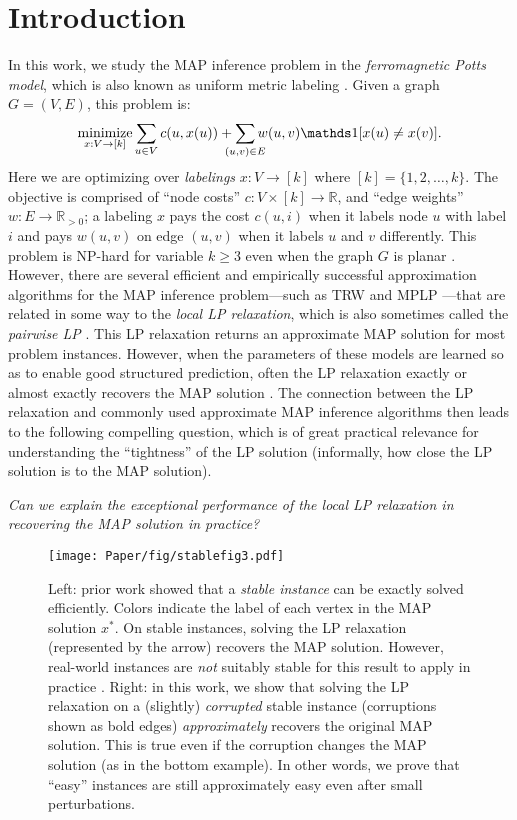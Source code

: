 \section{Introduction}
In this work, we study the MAP inference problem in the \emph{ferromagnetic Potts model}, which is also known as uniform metric labeling \citep{KleinbergTardos02}. Given a graph $G=(V,E)$, this problem is:
\begin{align*}
  \minimize_{x: V\to [k]}\sum_{u\in V}c(u, x(u)) + \smashoperator{\sum_{(u,v) \in E}}w(u,v)\indicator[x(u) \ne x(v)].
\end{align*}
Here we are optimizing over \emph{labelings} $x: V\to [k]$ where $ [k] = \{1,2,\dots,k\}$. 
The objective is comprised of ``node costs'' $c: V\times [k] \to \mathbb{R}$, and ``edge weights'' $w: E \to \mathbb{R}_{> 0}$; a labeling $x$ pays the cost $c(u,i)$ when it labels node $u$ with label $i$ and pays $w(u,v)$ on edge $(u,v)$ when it labels $u$ and $v$ differently.
This problem is NP-hard for variable $k \ge 3$ \citep{KleinbergTardos02} even when the graph $G$ is planar \citep{dahlhaus1992complexity}.
However, there are several efficient and empirically successful approximation algorithms for the MAP inference problem---such as TRW \citep{wainwright2005map} and MPLP \citep{globerson2008fixing}---that are related in some way to the \emph{local LP relaxation}, which is also sometimes called the {\em pairwise LP} \cite{wainwright2008graphical, chekuri2001approximation}.  
This LP relaxation returns an approximate MAP solution for most problem instances. However, when the parameters of these models are learned so as to enable good structured prediction, often the LP relaxation exactly or almost exactly recovers the MAP solution  \citep{meshi2019train}.
The connection between the LP relaxation and commonly used approximate MAP inference algorithms then leads to the following compelling question, which is of great practical relevance for understanding the ``tightness'' of the LP solution (informally, how close the LP solution is to the MAP solution). 

{\em Can we explain the exceptional performance of the local LP relaxation in recovering the MAP solution in practice?}

\begin{figure*}[t]
\centering
\texttt{[image: Paper/fig/stablefig3.pdf]}
\caption{Left: prior work \citep{LanSonVij18} showed that a \emph{stable instance} can be exactly solved efficiently. Colors indicate the label of each vertex in the MAP solution $x^*$. On stable instances, solving the LP relaxation (represented by the arrow) recovers the MAP solution. However, real-world instances are \emph{not} suitably stable for this result to apply in practice \citep{LanSonVij19}. Right: in this work, we show that solving the LP relaxation on a (slightly) \emph{corrupted} stable instance (corruptions shown as bold edges) \emph{approximately} recovers the original MAP solution. This is true even if the corruption changes the MAP solution (as in the bottom example). In other words, we prove that ``easy'' instances are still approximately easy even after small perturbations.}
\label{fig:main-idea}
\end{figure*}

